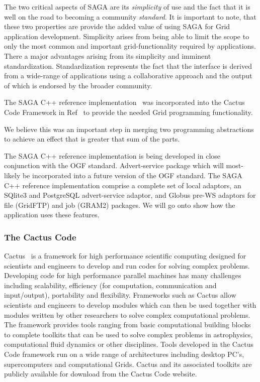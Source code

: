\documentclass[conference,final]{IEEEtran}
\newcommand{\CC}{\ccomment}
\begin{document}
The two critical aspects of SAGA are its {\it simplicity} of use and the
fact that it is well on the road to becoming a community {\it standard}.
It is important to note, that these two properties are 
provide the added value of using SAGA for Grid application development.
Simplicity arises from being able to limit the scope to only the most
common and important grid-functionality required by applications.
There a major advantages arising from its simplicity and imminent
standardization.  Standardization represents the fact that the
interface is derived from a wide-range of applications using a
collaborative approach and the output of which is endorsed by the
broader community.

The SAGA C++ reference implementation~\cite{saga_web} was incorporated
into the Cactus Code Framework in Ref~\cite{escience07} to provide the
needed Grid programming functionality. 

We believe this was an important step in merging two programming
abstractions to achieve an effect that is greater that sum of the
parts.

The SAGA C++ reference implementation is being developed in close
conjunction with the OGF standard.  Advert-service package which will
most-likely be incorporated into a future version of the OGF standard.
The SAGA C++ reference implementation comprise a complete set of local
adaptors, an SQlite3 and PostgreSQL advert-service adaptor, and Globus
pre-WS adaptors for file (GridFTP) and job (GRAM2) packages. We will
go onto show how the application uses these features.

\subsubsection{The Cactus Code~\cite{cactus_web}}

\CC{Need to reduce in length}

Cactus~\cite{X0} is a framework for high performance scientific
computing designed for scientists and engineers to develop and run
codes for solving complex problems.  Developing code for high
performance parallel machines has many challenges including
scalability, efficiency (for computation, communication and
input/output), portability and flexibility. Frameworks such as Cactus
allow scientists and engineers to develop modules which can then be
used together with modules written by other researchers to solve
complex computational problems. The framework provides tools ranging
from basic computational building blocks to complete toolkits that can
be used to solve complex problems in astrophysics, computational fluid
dynamics or other disciplines.  Tools developed in the Cactus Code
framework run on a wide range of architectures including desktop PC's,
supercomputers and computational Grids. Cactus and its associated
toolkits are publicly available for download from the Cactus Code
website.
\end{document}
